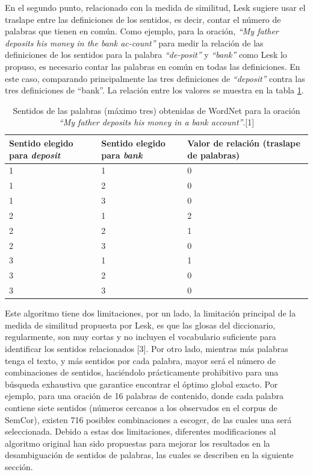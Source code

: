 \clearpage
En el segundo punto, relacionado con la medida de similitud, Lesk sugiere usar el traslape entre las definiciones de los sentidos, es decir, contar el número de palabras que tienen en común. 
Como ejemplo, para la oración, \textit{“My father deposits his money in the bank ac-count”} para medir la relación de las definiciones de los sentidos para la palabra \textit{“de-posit”} y \textit{“bank”} como Lesk lo propuso, es necesario contar las palabras en común en todas las definiciones. En este caso, comparando principalmente las tres definiciones de \textit{“deposit”} contra las tres definiciones de “bank”. La relación entre los valores se muestra en la tabla \ref{tab:sentidos_palabras}.

  \begin{table}[]
    \centering
      \begin{tabular}{|m{4cm}|m{4cm}|m{4cm}|}
      \hline
      Sentido elegido para \textit{deposit} & Sentido elegido para \textit{bank} & Valor de relación (traslape de palabras)\\
      \hline
      1 & 1 & 0 \\
      \hline
      1 & 2 & 0 \\
      \hline
      1 & 3 & 0 \\
      \hline
      2 & 1 & 2 \\
      \hline
      2 & 2 & 1 \\
      \hline
      2 & 3 & 0 \\
      \hline
      3 & 1 & 1 \\
      \hline
      3 & 2 & 0 \\
      \hline
      3 & 3 & 0 \\
      \hline
     \end{tabular}
   \caption{Sentidos de las palabras (máximo tres) obtenidas de WordNet para la oración \textit{“My father deposits his money in a bank account”}.[1]}
   \label{tab:sentidos_palabras}
  \end{table}

Este algoritmo tiene dos limitaciones, por un lado, la limitación principal de la medida de similitud propuesta por Lesk, es que las glosas del diccionario, regularmente, son muy cortas y no incluyen el vocabulario suficiente para identificar los sentidos relacionados [3]. 
Por otro lado, mientras más palabras tenga el texto, y más sentidos por cada palabra, mayor será el número de combinaciones de sentidos, haciéndolo prácticamente prohibitivo para una búsqueda exhaustiva que garantice encontrar el óptimo global exacto. Por ejemplo, para una oración de 16 palabras de contenido, donde cada palabra contiene siete sentidos (números cercanos a los observados en el corpus de SemCor), existen 716 posibles combinaciones a escoger, de las cuales una será seleccionada. 
Debido a estas dos limitaciones, diferentes modificaciones al algoritmo original han sido propuestas para mejorar los resultados en la desambiguación de sentidos de palabras, las cuales se describen en la siguiente sección.

